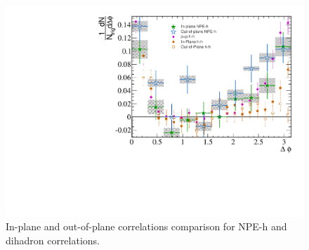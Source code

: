 \begin{figure}[htbp]
\begin{center}
\includegraphics[scale=.8]{Plots/Correlations/EP/NPE_subtracted_eh_corr_in-out_comp_with_pub_primpt_4_5_cent_2_5_assopt_3_4.pdf}
\end{center}
\caption[Event Plane Dependent Correlation Comparison]{In-plane and out-of-plane correlations comparison for NPE-h and dihadron correlations.}
\label{fig:EP_comparison}
\end{figure}

